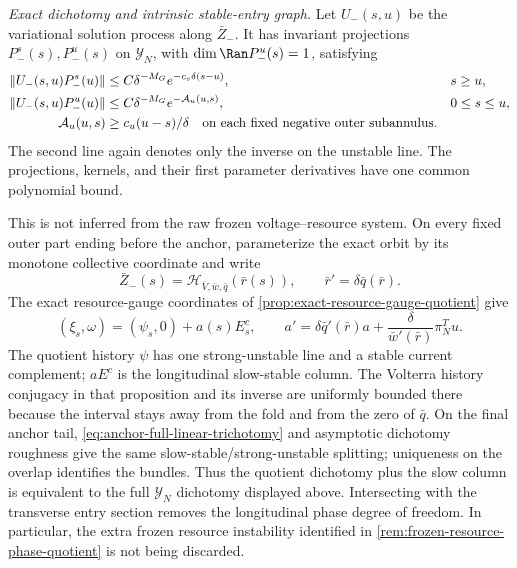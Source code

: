 \begin{lemma}
\smallskip
\noindent
\emph{Exact dichotomy and intrinsic stable-entry graph.}
Let \(U_-(s,u)\) be the variational solution process along
\(\bar Z_-\).  It has invariant projections \(P_-^s(s),P_-^u(s)\) on
\(\mathscr Y_N\), with \(\dim\Ran P_-^u(s)=1\), satisfying
\begin{align}
 \|U_-(s,u)P_-^s(u)\|
 &\le C\delta^{-M_G}e^{-c_s\delta(s-u)},&&s\ge u,\notag\\
 \|U_-(s,u)P_-^u(u)\|
 &\le C\delta^{-M_G}e^{-\mathcal A_u(u,s)},&&0\le s\le u,
                                                               \label{eq:anchor-annulus-Green-kernels}\\
 \mathcal A_u(u,s)&\ge c_u(u-s)/\delta
 \quad\hbox{on each fixed negative outer subannulus}. \notag
\end{align}
The second line again denotes only the inverse on the unstable line.
The projections, kernels, and their first parameter derivatives have one
common polynomial bound.

This is not inferred from the raw frozen voltage--resource system.  On
every fixed outer part ending before the anchor, parameterize the exact
orbit by its monotone collective coordinate and write
\[
 \bar Z_-(s)=\mathcal H_{\bar V,\bar w,\bar q}(\bar r(s)),
 \qquad \bar r'=\delta\bar q(\bar r).
\]
The exact resource-gauge coordinates of
\cref{prop:exact-resource-gauge-quotient} give
\begin{equation}
 (\xi_s,\omega)
 =(\psi_s,0)+a(s)E_s^c,\qquad
 a'=\delta\bar q'(\bar r)a
       +\frac{\delta}{\bar w'(\bar r)}\pi_N^Tu .       \label{eq:anchor-exact-resource-phase-splitting}
\end{equation}
The quotient history \(\psi\) has one strong-unstable line and a stable
current complement; \(aE^c\) is the longitudinal slow-stable column.
The Volterra history conjugacy in that proposition and its inverse are
uniformly bounded there because the interval stays away from the fold and
from the zero of \(\bar q\).  On the final anchor tail,
\cref{eq:anchor-full-linear-trichotomy} and asymptotic dichotomy roughness
give the same slow-stable/strong-unstable splitting; uniqueness on the
overlap identifies the bundles.  Thus the quotient dichotomy plus the slow
column is equivalent to the full \(\mathscr Y_N\) dichotomy displayed
above.  Intersecting with the
transverse entry section removes the longitudinal phase degree of freedom.
In particular, the extra frozen resource instability identified in
\cref{rem:frozen-resource-phase-quotient} is not being discarded.


\end{lemma}
